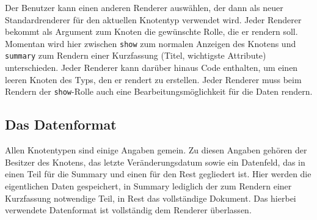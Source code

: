 \documentclass[12pt,ngerman,a4]{scrartcl}
\newcommand{\pquote}[1]{\glqq #1\grqq}
\newcommand{\code}[1]{\texttt{#1}}
\begin{document}
Der Benutzer kann einen anderen Renderer auswählen, der dann als neuer Standardrenderer für den aktuellen Knotentyp verwendet wird. Jeder Renderer bekommt als Argument zum Knoten die gewünschte Rolle, die er rendern soll. Momentan wird hier zwischen \code{show} zum normalen Anzeigen des Knotens und \code{summary} zum Rendern einer Kurzfassung (Titel, wichtigste Attribute) unterschieden. Jeder Renderer kann darüber hinaus Code enthalten, um einen leeren Knoten des Typs, den er rendert zu erstellen. Jeder Renderer muss beim Rendern der \code{show}-Rolle auch eine Bearbeitungsmöglichkeit für die Daten rendern.

\subsection{Das Datenformat}
Allen Knotentypen sind einige Angaben gemein. Zu diesen Angaben gehören der \pquote{Besitzer} des Knotens, das letzte Veränderungsdatum sowie ein Datenfeld, das in einen Teil für die \pquote{Summary} und einen für den \pquote{Rest} gegliedert ist. Hier werden die eigentlichen Daten gespeichert, in Summary lediglich der zum Rendern einer Kurzfassung notwendige Teil, in Rest das vollständige Dokument. Das hierbei verwendete Datenformat ist vollständig dem Renderer überlassen.
\end{document}
